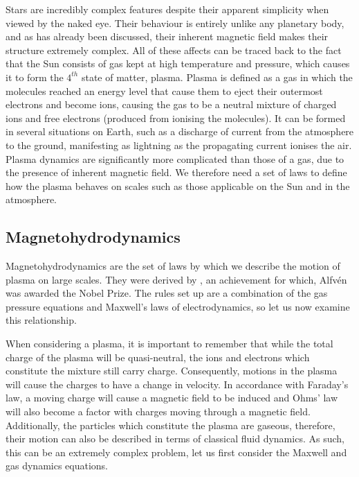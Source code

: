 Stars are incredibly complex features despite their apparent simplicity when viewed by the naked eye.
Their behaviour is entirely unlike any planetary body, and as has already been discussed, their inherent magnetic field makes their structure extremely complex.
All of these affects can be traced back to the fact that the Sun consists of gas kept at high temperature and pressure, which causes it to form the $4^{th}$ state of matter, plasma.
Plasma is defined as a gas in which the molecules reached an energy level that cause them to eject their outermost electrons and become ions, causing the gas to be a neutral mixture of charged ions and free electrons (produced from ionising the molecules).
It can be formed in several situations on Earth, such as a discharge of current from the atmosphere to the ground, manifesting as lightning as the propagating current ionises the air.
Plasma dynamics are significantly more complicated than those of a gas, due to the presence of inherent magnetic field. 
We therefore need a set of laws to define how the plasma behaves on scales such as those applicable on the Sun and in the atmosphere.


\subsection{Magnetohydrodynamics}

Magnetohydrodynamics are the set of laws by which we describe the motion of plasma on large scales.
They were derived by \cite{Alfven1942}, an achievement for which, Alfv{\'e}n was awarded the Nobel Prize.
The rules set up are a combination of the gas pressure equations and Maxwell's laws of electrodynamics, so let us now examine this relationship.

When considering a plasma, it is important to remember that while the total charge of the plasma will be quasi-neutral, the ions and electrons which constitute the mixture still carry charge.
Consequently, motions in the plasma will cause the charges to have a change in velocity.
In accordance with Faraday's law, a moving charge will cause a magnetic field to be induced and Ohms' law will also become a factor with charges moving through a magnetic field.
Additionally, the particles which constitute the plasma are gaseous, therefore, their motion can also be described in terms of classical fluid dynamics.
As such, this can be an extremely complex problem, let us first consider the Maxwell and gas dynamics equations.

